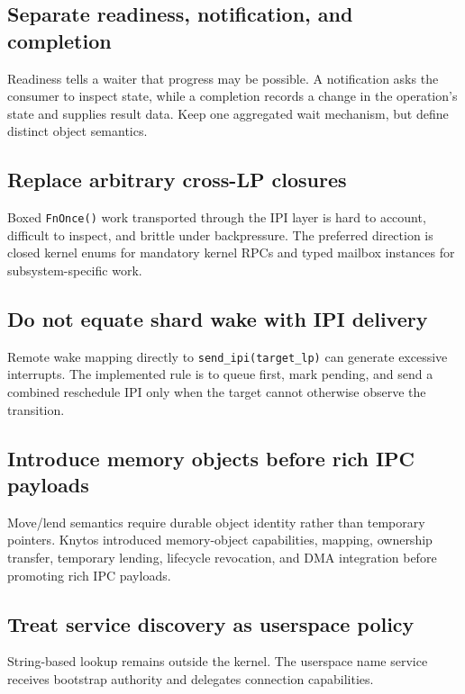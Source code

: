 \subsection{Separate readiness, notification, and completion}

Readiness tells a waiter that progress may be possible. A notification asks the
consumer to inspect state, while a completion records a change in the
operation's state and supplies result data. Keep one aggregated wait mechanism,
but define distinct object semantics.

\subsection{Replace arbitrary cross-LP closures}

Boxed \texttt{FnOnce()} work transported through the IPI layer is hard to
account, difficult to inspect, and brittle under backpressure.
The preferred direction is closed kernel enums for mandatory kernel RPCs and
typed mailbox instances for subsystem-specific work.

\subsection{Do not equate shard wake with IPI delivery}

Remote wake mapping directly to \texttt{send\_ipi(target\_lp)} can generate
excessive interrupts. The implemented rule is to queue first, mark pending, and send
a combined reschedule IPI only when the target cannot otherwise observe the
transition.

\subsection{Introduce memory objects before rich IPC payloads}

Move/lend semantics require durable object identity rather than temporary
pointers. Knytos introduced memory-object capabilities, mapping, ownership
transfer, temporary lending, lifecycle revocation, and DMA integration before
promoting rich IPC payloads.

\subsection{Treat service discovery as userspace policy}

String-based lookup remains outside the kernel. The userspace name service
receives bootstrap authority and delegates connection capabilities.

\endinput
